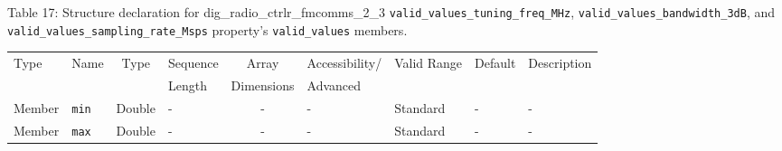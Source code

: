 \documentclass{article}
\def\comp{dig\_radio\_ctrlr\_fmcomms\_2\_3}
\begin{document}
\begin{landscape}
	\noindent Table \hypertarget{tab17}{17}: Structure declaration for \comp{} \verb+valid_values_tuning_freq_MHz+, \verb+valid_values_bandwidth_3dB+, and \\ \verb+valid_values_sampling_rate_Msps+ property's \verb+valid_values+ members.
	\begin{scriptsize}
		\noindent\begin{longtable}{|p{1.8cm}|p{3.6cm}|c|p{4cm}|c|p{2cm}|p{1.7cm}|p{0.8cm}|p{4.69cm}|}
			\hline
			\rowcolor{blue}
			Type         & Name                                & Type & Sequence & Array      & Accessibility/ & Valid Range  & Default & Description                                                                                                                                                                                                                       \\
			\rowcolor{blue}
			             &                                     &      & Length   & Dimensions & Advanced       &              &         &                                                                                                                                                                                                                             \\
			\hline
			Member       & \verb+min+                          & Double & -       & -          & -              & Standard     & -       & - \\
			\hline
			Member       & \verb+max+                          & Double & -       & -          & -              & Standard     & -       & - \\
			\hline
		\end{longtable}
	\end{scriptsize}


\end{landscape}
\end{document}
